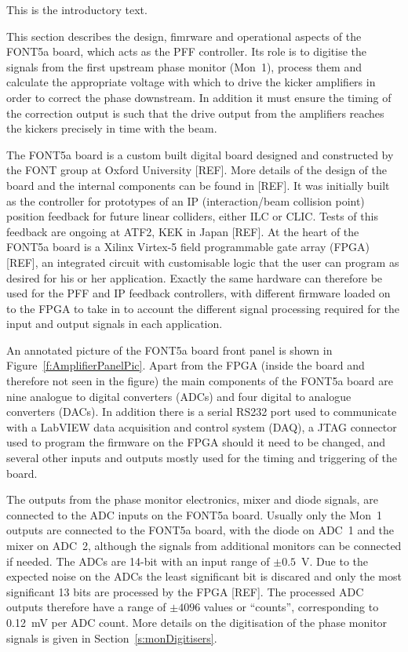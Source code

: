 
This is the introductory text. \cite{Dummy}


This section describes the design, fimrware and operational aspects of the FONT5a board, which acts as the PFF controller. Its role is to digitise the signals from the first upstream phase monitor (Mon~1), process them and calculate the appropriate voltage with which to drive the kicker amplifiers in order to correct the phase downstream. In addition it must ensure the timing of the correction output is such that the drive output from the amplifiers reaches the kickers precisely in time with the beam.

The FONT5a board is a custom built digital board designed and constructed by the FONT group at Oxford University [REF]. More details of the design of the board and the internal components can be found in [REF]. It was initially built as the controller for prototypes of an IP (interaction/beam collision point) position feedback for future linear colliders, either ILC or CLIC. Tests of this feedback are ongoing at ATF2, KEK in Japan  [REF]. At the heart of the FONT5a board is a Xilinx Virtex-5 field programmable gate array (FPGA) [REF], an integrated circuit with customisable logic that the user can program as desired for his or her application. Exactly the same hardware can therefore be used for the PFF and IP feedback controllers, with different firmware loaded on to the FPGA to take in to account the different signal processing required for the input and output signals in each application.

An annotated picture of the FONT5a board front panel is shown in Figure~\ref{f:AmplifierPanelPic}. Apart from the FPGA (inside the board and therefore not seen in the figure) the main components of the FONT5a board are nine analogue to digital converters (ADCs) and four digital to analogue converters (DACs). In addition there is a serial RS232 port used to communicate with a LabVIEW data acquisition and control system (DAQ), a JTAG connector used to program the firmware on the FPGA should it need to be changed, and several other inputs and outputs mostly used for the timing and triggering of the board.

The outputs from the phase monitor electronics, mixer and diode signals, are connected to the ADC inputs on the FONT5a board. Usually only the Mon~1 outputs are connected to the FONT5a board, with the diode on ADC~1 and the mixer on ADC~2, although the signals from additional monitors can be connected if needed. The ADCs are 14-bit with an input range of \(\pm0.5\)~V. Due to the expected noise on the ADCs the least significant bit is discared and only the most significant 13 bits are processed by the FPGA [REF]. The processed ADC outputs therefore have a range of \(\pm4096\) values or ``counts'', corresponding to 0.12~mV per ADC count. More details on the digitisation of the phase monitor signals is given in Section~\ref{s:monDigitisers}. 

